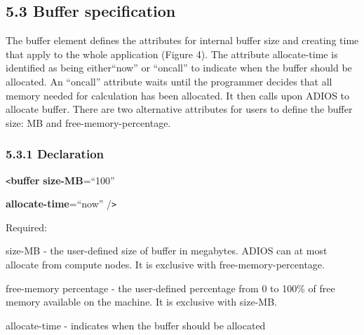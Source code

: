 \vspace{10pt}
\subsection*{{\large 5.3 }{\large \textbf{Buffer specification}}}

\vspace{10pt}
The buffer element defines the attributes for internal buffer size and creating 
time that apply to the whole application (Figure 4). The attribute allocate-time 
is identified as being either{\small  ``}now'' or ``oncall'' to indicate when the 
buffer should be allocated. An ``oncall'' attribute waits until the programmer 
decides that all memory needed for calculation has been allocated. It then calls 
upon ADIOS to allocate buffer. There are two alternative attributes for users to 
define the buffer size: MB and free-memory-percentage. \label{HToc84890253}\label{HToc212016629}\label{HToc212016871}\label{HToc182553375}

\vspace{10pt}
\subsubsection*{{\large \textbf{5.3.1 Declaration}}}

\vspace{10pt}
\texttt{<}\textbf{buffer} \textbf{size-MB}=``100'' 

\vspace{10pt}
\leftskip=45pt
\textbf{allocate-time}=``now'' /\texttt{>}

\vspace{22pt}
\leftskip=0pt
Required:

\vspace{10pt}
\leftskip=76pt
\parindent=-58pt
size-MB - the user-defined size of  buffer in megabytes. ADIOS can at most allocate 
from compute nodes. It is exclusive with free-memory-percentage.

\vspace{10pt}
free-memory percentage - the user-defined percentage from 0 to 100\% of free memory 
available on the machine. It is exclusive with size-MB.

\vspace{10pt}
\leftskip=18pt
\parindent=3pt
allocate-time - indicates when the buffer should be allocated\label{HToc84890254}\label{HToc212016630}\label{HToc212016872}\label{HToc182553376}

\vspace{10pt}
